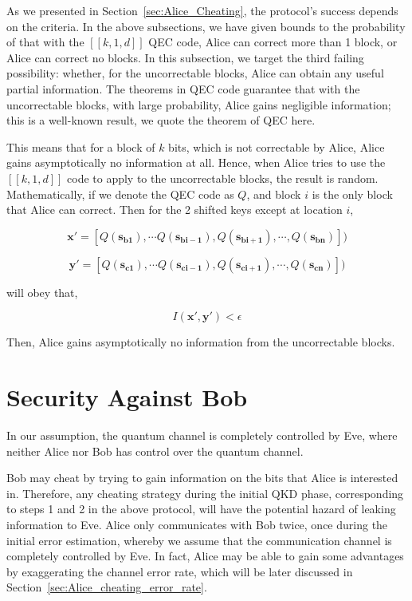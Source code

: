 \documentclass[%
 reprint,
superscriptaddress,
 amsmath,amssymb,
 aps,
]{revtex4-2}
\begin{document}
As we presented in Section~\ref{sec:Alice_Cheating}, the protocol's success depends on the criteria. In the above subsections, we have given bounds to the probability of that with the $[[k, 1, d]]$ QEC code, Alice can correct more than 1 block, or Alice can correct no blocks. In this subsection, we target the third failing possibility: whether, for the uncorrectable blocks, Alice can obtain any useful partial information. The theorems in QEC code guarantee that with the uncorrectable blocks, with large probability, Alice gains negligible information; this is a well-known result, we quote the theorem of QEC here.

This means that for a block of $k$ bits, which is not correctable by Alice, Alice gains asymptotically no information at all. Hence, when Alice tries to use the $[[k, 1, d]]$ code to apply to the uncorrectable blocks, the result is random. Mathematically, if we denote the QEC code as $Q$, and block $i$ is the only block that Alice can correct. Then for the 2 shifted keys except at location $i$,

\begin{equation}
    \mathbf{x'}=[Q(\mathbf{s_{b1}}), \cdots Q(\mathbf{s_{bi-1}}), Q(\mathbf{s_{bi+1}}), \cdots, Q(\mathbf{s_{bn}}) ])
\end{equation}

\begin{equation}
    \mathbf{y'}=[Q(\mathbf{s_{c1}}), \cdots Q(\mathbf{s_{ci-1}}), Q(\mathbf{s_{ci+1}}), \cdots, Q(\mathbf{s_{cn}}) ])
\end{equation}

will obey that,

\begin{equation}
    I(\mathbf{x'}, \mathbf{y'})<\epsilon
\end{equation}

Then, Alice gains asymptotically no information from the uncorrectable blocks.


\section{Security Against Bob}

In our assumption, the quantum channel is completely controlled by Eve, where neither Alice nor Bob has control over the quantum channel.

Bob may cheat by trying to gain information on the bits that Alice is interested in. Therefore, any cheating strategy during the initial QKD phase, corresponding to steps 1 and 2 in the above protocol, will have the potential hazard of leaking information to Eve. Alice only communicates with Bob twice, once during the initial error estimation, whereby we assume that the communication channel is completely controlled by Eve. In fact, Alice may be able to gain some advantages by exaggerating the channel error rate, which will be later discussed in Section~\ref{sec:Alice_cheating_error_rate}. 
\end{document}
